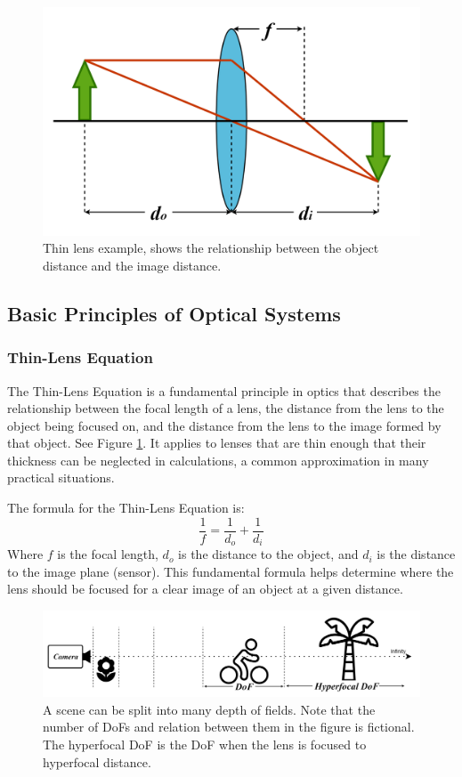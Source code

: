 \documentclass{article}
\begin{document}
\begin{figure}
\centering
\includegraphics[width=0.6\linewidth]{thin_lens_schema.png}
\caption{\label{fig:thinlens}Thin lens example, shows the relationship between the object distance and the image distance.}
\end{figure}


\subsection{Basic Principles of Optical Systems}
\subsubsection{Thin-Lens Equation}
\label{sec:thinlens}

The Thin-Lens Equation is a fundamental principle in optics that describes the relationship between the focal length of a lens, the distance from the lens to the object being focused on, and the distance from the lens to the image formed by that object. See Figure \ref{fig:thinlens}. It applies to lenses that are thin enough that their thickness can be neglected in calculations, a common approximation in many practical situations.

The formula for the Thin-Lens Equation is:
\[
\frac{1}{f} = \frac{1}{d_o} + \frac{1}{d_i}
\]
Where  \( f \)  is the focal length, \( d_o \) is the distance to the object, and \( d_i \) is the distance to the image plane (sensor). This fundamental formula helps determine where the lens should be focused for a clear image of an object at a given distance.


\begin{figure}
\centering
\includegraphics[width=0.8\linewidth]{dof.png}
\caption{\label{fig:dof} A scene can be split into many depth of fields. Note that the number of DoFs and relation between them in the figure is fictional. The hyperfocal DoF is the DoF when the lens is focused to  hyperfocal distance.}
\end{figure}
\end{document}
